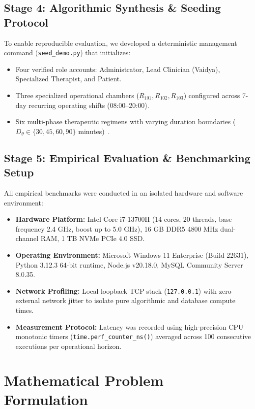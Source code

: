 \documentclass[conference]{IEEEtran}
\begin{document}
\subsection{Stage 4: Algorithmic Synthesis \& Seeding Protocol}
To enable reproducible evaluation, we developed a deterministic management command (\texttt{seed\_demo.py}) that initializes:
\begin{itemize}
    \item Four verified role accounts: Administrator, Lead Clinician (Vaidya), Specialized Therapist, and Patient.
    \item Three specialized operational chambers ($R_{101}, R_{102}, R_{103}$) configured across 7-day recurring operating shifts (08:00--20:00).
    \item Six multi-phase therapeutic regimens with varying duration boundaries ($D_{\theta} \in \{30, 45, 60, 90\}$ minutes)~\cite{singh2008holistic}.
\end{itemize}

\subsection{Stage 5: Empirical Evaluation \& Benchmarking Setup}
All empirical benchmarks were conducted in an isolated hardware and software environment:
\begin{itemize}
    \item \textbf{Hardware Platform:} Intel Core i7-13700H (14 cores, 20 threads, base frequency 2.4 GHz, boost up to 5.0 GHz), 16 GB DDR5 4800 MHz dual-channel RAM, 1 TB NVMe PCIe 4.0 SSD.
    \item \textbf{Operating Environment:} Microsoft Windows 11 Enterprise (Build 22631), Python 3.12.3 64-bit runtime, Node.js v20.18.0, MySQL Community Server 8.0.35.
    \item \textbf{Network Profiling:} Local loopback TCP stack (\texttt{127.0.0.1}) with zero external network jitter to isolate pure algorithmic and database compute times.
    \item \textbf{Measurement Protocol:} Latency was recorded using high-precision CPU monotonic timers (\texttt{time.perf\_counter\_ns()}) averaged across 100 consecutive executions per operational horizon.
\end{itemize}

\section{Mathematical Problem Formulation}
\end{document}
